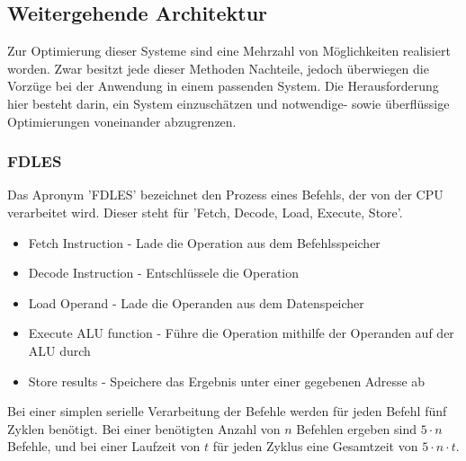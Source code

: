 \subsection{Weitergehende Architektur}\label{2.4}
Zur Optimierung dieser Systeme sind eine Mehrzahl von Möglichkeiten realisiert worden. Zwar besitzt jede dieser Methoden Nachteile, jedoch überwiegen die Vorzüge bei der Anwendung in einem passenden System. Die Herausforderung hier besteht darin, ein System einzuschätzen und notwendige- sowie überflüssige Optimierungen voneinander abzugrenzen.

\subsubsection{FDLES}
Das Apronym 'FDLES' bezeichnet den Prozess eines Befehls, der von der CPU verarbeitet wird. Dieser steht für 'Fetch, Decode, Load, Execute, Store'.

\begin{itemize}
\item Fetch Instruction - Lade die Operation aus dem Befehlsspeicher
\item Decode Instruction - Entschlüssele die Operation
\item Load Operand - Lade die Operanden aus dem Datenspeicher
\item Execute ALU function - Führe die Operation mithilfe der Operanden auf der ALU durch
\item Store results - Speichere das Ergebnis unter einer gegebenen Adresse ab 
\end{itemize}
Bei einer simplen serielle Verarbeitung der Befehle werden für jeden Befehl fünf Zyklen benötigt. Bei einer benötigten Anzahl von $n$ Befehlen ergeben sind $5\cdot n$ Befehle, und bei einer Laufzeit von $t$ für jeden Zyklus eine Gesamtzeit von $5\cdot n\cdot t$.
